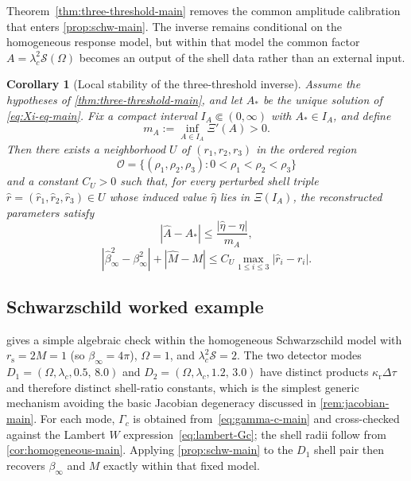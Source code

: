 \documentclass[11pt]{article}
\newtheorem{corollary}[theorem]{Corollary}
\theoremstyle{definition}
\begin{document}
Theorem~\ref{thm:three-threshold-main} removes the common amplitude calibration that enters \cref{prop:schw-main}. The inverse remains conditional on the homogeneous response model, but within that model the common factor $A=\lambda_c^2\mathcal S(\Omega)$ becomes an output of the shell data rather than an external input.

\begin{corollary}[Local stability of the three-threshold inverse]\label{cor:three-threshold-stability-main}
Assume the hypotheses of \cref{thm:three-threshold-main}, and let $A_\ast$ be the unique solution of \eqref{eq:Xi-eq-main}. Fix a compact interval $I_A\Subset(0,\infty)$ with $A_\ast\in I_A$, and define
\[
m_A:=\inf_{A\in I_A}\Xi'(A)>0.
\]
Then there exists a neighborhood $U$ of $(r_1,r_2,r_3)$ in the ordered region
\[
\mathcal O=\{(\rho_1,\rho_2,\rho_3):0<\rho_1<\rho_2<\rho_3\}
\]
and a constant $C_U>0$ such that, for every perturbed shell triple $\widehat r=(\widehat r_1,\widehat r_2,\widehat r_3)\in U$ whose induced value $\widehat\eta$ lies in $\Xi(I_A)$, the reconstructed parameters satisfy
\begin{equation}\label{eq:amp-stability-main}
|\widehat A-A_\ast|
\le
\frac{|\widehat\eta-\eta|}{m_A},
\end{equation}
\begin{equation}\label{eq:geom-stability-main}
|\widehat\beta_\infty^2-\beta_\infty^2|
+
|\widehat M-M|
\le
C_U\max_{1\le i\le3}|\widehat r_i-r_i|.
\end{equation}
\end{corollary}

\subsection{Schwarzschild worked example}\label{subsec:worked-example}

 gives a simple algebraic check within the homogeneous Schwarzschild model with $r_{\mathrm s}=2M=1$ (so $\beta_\infty=4\pi$), $\Omega=1$, and $\lambda_c^2\mathcal S=2$. The two detector modes $D_1=(\Omega,\lambda_c,0.5,\,8.0)$ and $D_2=(\Omega,\lambda_c,1.2,\,3.0)$ have distinct products $\kappa_{\mathrm r}\Delta\tau$ and therefore distinct shell-ratio constants, which is the simplest generic mechanism avoiding the basic Jacobian degeneracy discussed in \cref{rem:jacobian-main}. For each mode, $\Gamma_c$ is obtained from~\eqref{eq:gamma-c-main} and cross-checked against the Lambert $W$ expression~\eqref{eq:lambert-Gc}; the shell radii follow from \cref{cor:homogeneous-main}. Applying \cref{prop:schw-main} to the $D_1$ shell pair then recovers $\beta_\infty$ and $M$ exactly within that fixed model.
\end{document}
